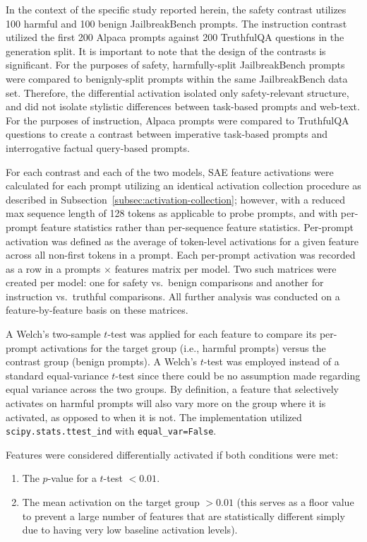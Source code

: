 In the context of the specific study reported herein, the safety contrast utilizes 100 harmful and 100 benign JailbreakBench prompts. The instruction contrast utilized the first 200 Alpaca prompts against 200 TruthfulQA questions in the generation split.
It is important to note that the design of the contrasts is significant. For the purposes of safety, harmfully-split JailbreakBench prompts were compared to benignly-split prompts within the same JailbreakBench data set. Therefore, the differential activation isolated only safety-relevant structure, and did not isolate stylistic differences between task-based prompts and web-text. For the purposes of instruction, Alpaca prompts were compared to TruthfulQA questions to create a contrast between imperative task-based prompts and interrogative factual query-based prompts.

For each contrast and each of the two models, SAE feature activations were calculated for each prompt utilizing an identical activation collection procedure as described in Subsection~\ref{subsec:activation-collection}; however, with a reduced max sequence length of 128 tokens as applicable to probe prompts, and with per-prompt feature statistics rather than per-sequence feature statistics. Per-prompt activation was defined as the average of token-level activations for a given feature across all non-first tokens in a prompt. Each per-prompt activation was recorded as a row in a prompts $\times$ features matrix per model.
Two such matrices were created per model: one for safety vs.\ benign comparisons and another for instruction vs.\ truthful comparisons. All further analysis was conducted on a feature-by-feature basis on these matrices.

A Welch's two-sample $t$-test \parencite{welch_generalization_1947} was applied for each feature to compare its per-prompt activations for the target group (i.e., harmful prompts) versus the contrast group (benign prompts). A Welch's $t$-test was employed instead of a standard equal-variance $t$-test since there could be no assumption made regarding equal variance across the two groups. By definition, a feature that selectively activates on harmful prompts will also vary more on the group where it is activated, as opposed to when it is not. The implementation utilized \texttt{scipy.stats.ttest\_ind} with \texttt{equal\_var=False}.

Features were considered differentially activated if both conditions were met:
\begin{enumerate}
    \item The $p$-value for a $t$-test $< 0.01$.
    \item The mean activation on the target group $> 0.01$ (this serves as a floor value to prevent a large number of features that are statistically different simply due to having very low baseline activation levels).
\end{enumerate}

